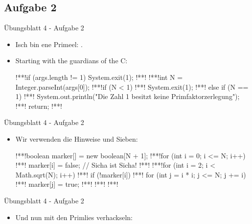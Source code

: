 \subsection{Aufgabe 2}
\begin{frame}[fragile]{Übungsblatt 4 - Aufgabe 2}
    \begin{itemize}[<+(1)->]
        \item Isch bin ene Primeel: .
        \item Starting with the guardians of the C:
\begin{plainjava}
!**!if (args.length != 1) System.exit(1);
!**!
!**!int N = Integer.parseInt(args[0]);
!**!if (N < 1) {
!**!    System.exit(1);
!**!} else if (N == 1) {
!**!    System.out.println("Die Zahl 1 besitzt keine Primfaktorzerlegung");
!**!    return;
!**!}
\end{plainjava}
    \end{itemize}
\end{frame}

\begin{frame}[fragile]{Übungsblatt 4 - Aufgabe 2}
    \begin{itemize}[<+(1)->]
        \item Wir verwenden die Hinweise und Sieben:
\begin{plainjava}
!**!boolean marker[] = new boolean[N + 1];
!**!for (int i = 0; i <= N; i++)
!**!    marker[i] = false; // Sicha ist Sicha!
!**!
!**!for (int i = 2; i < Math.sqrt(N); i++) {
!**!    if (!marker[i]) {
!**!        for (int j = i * i; j <= N; j += i) {
!**!            marker[j] = true;
!**!        }
!**!    }
!**!}
\end{plainjava}
    \end{itemize}
\end{frame}

\begin{frame}[fragile]{Übungsblatt 4 - Aufgabe 2}
    \begin{itemize}[<+(1)->]
        \item Und nun mit den Primlies verhackseln:
    \end{itemize}
\end{frame}

